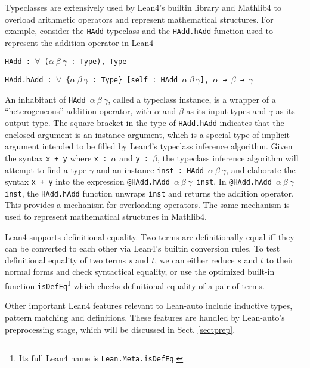   Typeclasses are extensively used by Lean4's builtin library and Mathlib4 to
  overload arithmetic operators and represent mathematical structures. For example,
  consider the \texttt{HAdd} typeclass and the \texttt{HAdd.hAdd} function
  used to represent the addition operator in Lean4
  
  \centerline{\texttt{HAdd : $\forall$ ($\alpha \ \beta \ \gamma$ : Type), Type}}
  \centerline{\texttt{HAdd.hAdd : $\forall$ \{$\alpha \ \beta \ \gamma$ : Type\} [self : HAdd $\alpha \ \beta \ \gamma$], $\alpha$ → $\beta$ → $\gamma$}}

  \noindent An inhabitant of \texttt{HAdd $\alpha \ \beta \ \gamma$}, called a
  typeclass instance, is a wrapper of a ``heterogeneous'' addition operator, with $\alpha$ and $\beta$ as its input types and
  $\gamma$ as its output type. The square bracket in the type of \texttt{HAdd.hAdd}
  indicates that the enclosed argument is an instance argument, which is a special type
  of implicit argument intended to be filled by Lean4's typeclass inference algorithm.
  Given the syntax \texttt{x + y} where \texttt{x : $\alpha$} and \texttt{y : $\beta$},
  the typeclass inference algorithm will attempt to find a type $\gamma$ and
  an instance \texttt{inst : HAdd $\alpha \ \beta \ \gamma$}, and elaborate the
  syntax \texttt{x + y} into the expression \texttt{@HAdd.hAdd $\alpha \ \beta \ \gamma$ inst}.
  In \texttt{@HAdd.hAdd $\alpha \ \beta \ \gamma$ inst}, the \texttt{HAdd.hAdd} function
  unwraps \texttt{inst} and returns the addition operator. This provides a mechanism
  for overloading operators. The same mechanism is used to represent mathematical
  structures in Mathlib4.

  Lean4 supports definitional equality. Two terms are definitionally equal
  iff they can be converted to each other via Lean4's builtin conversion rules.
  To test definitional equality of two terms $s$ and $t$, we can either reduce $s$ and
  $t$ to their normal forms and check syntactical equality, or use the optimized
  built-in function \texttt{isDefEq}\footnote{Its full Lean4 name is \texttt{Lean.Meta.isDefEq}.}
  which checks definitional equality of a pair of terms.

  Other important Lean4 features relevant to Lean-auto include inductive types, pattern matching and definitions.
  These features are handled by Lean-auto's preprocessing stage, which will be discussed in Sect. \ref{sectprep}.
